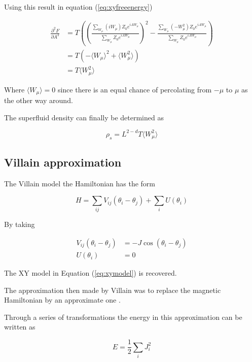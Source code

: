 Using this result in equation (\ref{eq:xyfreeenergy})

\begin{align}
    \frac{\partial^2 F}{\partial A^2} &= T \left ( \left ( \frac{\sum_{W_\mu} (i W_\mu) Z_0 e^{iAW_\mu}}{\sum_{W_\mu} Z_0 e^{iAW_\mu}} \right )^2 - \frac{\sum_{W_\mu} (- W_\mu^2) Z_0 e^{iAW_\mu}}{\sum_{W_\mu} Z_0 e^{iAW_\mu}} \right ) \\
%
    &= T \left ( -\langle W_\mu \rangle^2 + \langle W_\mu^2 \rangle \right ) \\
%
    &= T \langle W_\mu^2 \rangle
\end{align}

Where $\langle W_\mu \rangle = 0$ since there is an equal chance of percolating from $-\mu$ to $\mu$ as the other way around.

The superfluid density can finally be determined as

\begin{equation}
    \rho_s = L^{2 - d} T \langle W_\mu^2 \rangle 
\end{equation}

\subsection{Villain approximation}
\label{subsec:villainApprox}


The Villain model the Hamiltonian has the form \cite{Villain:VillainOriginalPaper}

\begin{equation}    
    H = \sum_{ij} V_{ij}( \theta_i - \theta_j) + \sum_i U(\theta_i)
\end{equation}

By taking

\begin{align}
    V_{ij}( \theta_i - \theta_j) &= -J \cos ( \theta_i - \theta_j) \\
    U( \theta_i ) &= 0
\end{align}

The XY model in Equation (\ref{eq:xymodel}) is recovered.

The approximation then made by Villain was to replace the magnetic Hamiltonian by an approximate one \cite{Villain:VillainOriginalPaper}.

Through a series of transformations the energy in this approximation can be written as \cite{Jos:VillainExtended}

\begin{equation}
    E = \frac{1}{2} \sum_i J_i^2
\end{equation}

